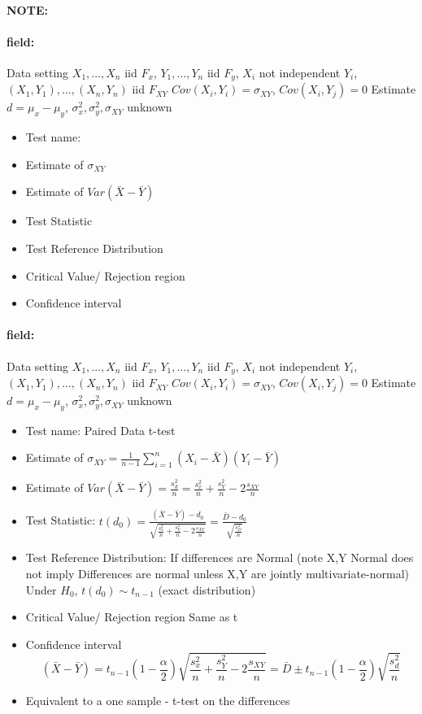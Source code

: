 \documentclass[12pt]{article}
\newenvironment{note}{\paragraph{NOTE:}}{}
\newenvironment{field}{\paragraph{field:}}{}
\begin{document}
\begin{note}
  \begin{field}
    Data setting $X_1, \ldots , X_n$ iid $F_x$, $Y_1, \ldots, Y_n$ iid $F_y$, $X_i$ not independent $Y_i$, $(X_1, Y_1), \ldots , (X_n,Y_n)$ iid $F_{XY}$ $Cov(X_i,Y_i) = \sigma_{XY}$, $Cov(X_i,Y_j) = 0$ Estimate $d = \mu_x - \mu_y$, $\sigma_x^2, \sigma_y^2, \sigma_{XY}$ unknown
    \begin{itemize}
      \item Test name:
      \item Estimate of $\sigma_{XY}$
      \item Estimate of $Var(\bar{X} - \bar{Y})$
      \item Test Statistic
      \item Test Reference Distribution
      \item Critical Value/ Rejection region
      \item Confidence interval
    \end{itemize}
  \end{field}
  \begin{field}
    Data setting $X_1, \ldots , X_n$ iid $F_x$, $Y_1, \ldots, Y_n$ iid $F_y$, $X_i$ not independent $Y_i$, $(X_1, Y_1), \ldots , (X_n,Y_n)$ iid $F_{XY}$ $Cov(X_i,Y_i) = \sigma_{XY}$, $Cov(X_i,Y_j) = 0$ Estimate $d = \mu_x - \mu_y$, $\sigma_x^2, \sigma_y^2, \sigma_{XY}$ unknown
    \begin{itemize}
      \item Test name: Paired Data t-test
      \item Estimate of $\sigma_{XY} = \frac{1}{n-1} \sum_{i=1}^n (X_i - \bar{X})(Y_i - \bar{Y})$
      \item Estimate of $Var(\bar{X} - \bar{Y}) = \frac{s_d^2}{n} = \frac{s_x^2}{n} + \frac{s_Y^2}{n} - 2 \frac{s_{XY}}{n}$
      \item Test Statistic: $t(d_0) = \frac{(\bar{X} - \bar{Y}) - d_0}{\sqrt{\frac{s_x^2}{n} + \frac{s_Y^2}{n} - 2 \frac{s_{XY}}{n}}} = \frac{\bar{D} - d_0}{\sqrt{\frac{s_D^2}{n}}}$
      \item Test Reference Distribution: If differences are Normal (note X,Y Normal does not imply Differences are normal unless X,Y are jointly multivariate-normal) Under $H_0$, $t(d_0) \sim t_{n-1}$ (exact distribution)
      \item Critical Value/ Rejection region Same as t
      \item Confidence interval
      $$ (\bar{X} - \bar{Y}) = t_{n-1}(1 - \frac{\alpha}{2})\sqrt{\frac{s_x^2}{n} + \frac{s_Y^2}{n} - 2 \frac{s_{XY}}{n}} = \bar{D} \pm  t_{n-1}(1 - \frac{\alpha}{2}) \sqrt{\frac{s_d^2}{n}}$$
      \item Equivalent to a one sample - t-test on the differences
    \end{itemize}
  \end{field}
\end{note}
\end{document}

